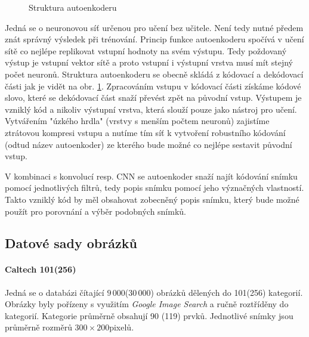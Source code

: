 \documentclass[12pt]{article}
\begin{document}
\begin{figure}
\caption{Struktura autoenkoderu}
\label{AE_struct}
\end{figure}

Jedná se o neuronovou síť určenou pro učení bez učitele. Není tedy nutné předem znát správný výsledek při trénování. Princip funkce autoenkoderu spočívá v učení sítě co nejlépe replikovat vstupní hodnoty na svém výstupu. Tedy poždovaný výstup je vstupní vektor sítě a proto vstupní i výstupní vrstva musí mít stejný počet neuronů. Struktura autoenkoderu se obecně skládá z kódovací a dekódovací části jak je vidět na obr. \ref{AE_struct}. Zpracováním vstupu v kódovací části získáme kódové slovo, které se dekódovací část snaží převést zpět na původní vstup. Výstupem je vzniklý kód a nikoliv  výstupní vrstva, která slouží pouze jako nástroj pro učení. Vytvářením "úzkého hrdla" (vrstvy s menším počtem neuronů) zajistíme ztrátovou kompresi vstupu a nutíme tím síť k vytvoření robustního kódování (odtud název autoenkoder) ze kterého bude možné co nejlépe sestavit původní vstup.

V kombinaci s konvolucí resp. CNN se autoenkoder snaží najít kódování snímku pomocí jednotlivých filtrů, tedy popis snímku pomocí jeho význačných vlastností. Takto vzniklý kód by měl obsahovat zobecněný popis snímku, který bude možné použít pro porovnání a výběr podobných snímků.

\subsection{Datové sady obrázků}





\paragraph{Caltech 101(256)\cite{caltech101}\cite{caltech256_report}}
Jedná se o databázi čítající $9\,000$($30\,000$) obrázků dělených do 101(256) kategorií. Obrázky byly pořízeny s využitím \textit{Google Image Search} a ručně roztříděny do kategorií. Kategorie průměrně obsahují 90 (119) prvků. Jednotlivé snímky jsou průměrně rozměrů $300\times 200$pixelů.
\end{document}
